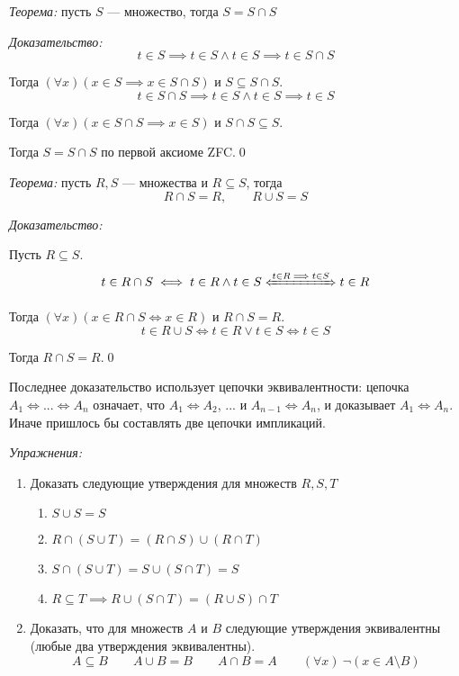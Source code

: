 {\it Теорема:} пусть $S$ --- множество, тогда $S=S\cap S$

{\it Доказательство:}
\[
	t\in S\implies t\in S\land t\in S\implies t\in S\cap S
\]

Тогда $(\forall x)(x\in S\implies x\in S\cap S)$ и $S\subseteq S\cap S$.
\[
	t\in S\cap S\implies t\in S\land t\in S\implies t\in S
\]

Тогда $(\forall x)(x\in S\cap S\implies x\in S)$ и $S\cap S\subseteq S$.

Тогда $S=S\cap S$ по первой аксиоме ZFC.\qed

{\it Теорема:} пусть $R,S$ --- множества и $R\subseteq S$, тогда
\[
	R\cap S= R,\qquad R\cup S= S
\]

{\it Доказательство:}

Пусть $R\subseteq S$.
\[
	t\in R\cap S\iff t\in R\land t\in S\xLeftrightarrow{t\in R\implies t\in S} t\in R
\]

Тогда $(\forall x)(x\in R\cap S\iff x\in R)$ и $R\cap S=R$.
\[
	t\in R\cup S\iff t\in R\lor t\in S\iff t\in S
\]

Тогда $R\cap S=R$.\qed

Последнее доказательство использует цепочки эквивалентности:
цепочка $A_1\iff...\iff A_{n}$ означает, что $A_1\iff A_2$, ... и
$A_{n-1}\iff A_{n}$, и доказывает $A_1\iff A_{n}$. Иначе пришлось
бы составлять две цепочки импликаций.

\pagebreak

\newcommand\eset{\varnothing}
{\it Упражнения:}
\begin{enumerate}
	\item{}Доказать следующие утверждения для множеств $R,S,T$
	\begin{fullwidth}
		\begin{multicols}{2}
			\begin{enumerate}
				\item{}$S\cup S=S$
				\item{}$R\cap (S\cup T)=(R\cap S)\cup (R\cap T)$
				\item{}$S\cap (S\cup T)=S\cup (S\cap T)=S$
				\item{}$R\subseteq T\implies R\cup (S\cap T)=(R\cup S)\cap T$
			\end{enumerate}
		\end{multicols}
	\end{fullwidth}

	\item{}Доказать, что для множеств $A$ и $B$ следующие утверждения эквивалентны
	(любые два утверждения эквивалентны).
	\[
		A\subseteq B\qquad A\cup B=B\qquad A\cap B=A
		\qquad (\forall x)~\lnot(x\in A\setminus B)
	\]
\end{enumerate}

